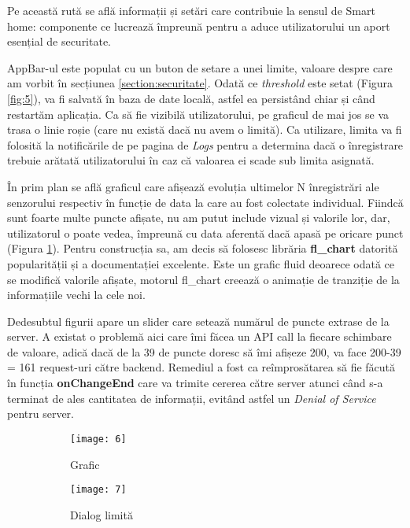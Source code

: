 Pe această rută se află informații și setări care contribuie la sensul de Smart home: componente ce lucrează împreună pentru a aduce utilizatorului un aport esențial de securitate.

AppBar-ul este populat cu un buton de setare a unei limite, valoare despre care am vorbit în secțiunea \ref{section:securitate}. Odată ce \emph{threshold} este setat (Figura \ref{fig:5}), va fi salvată în baza de date locală, astfel ea persistând chiar și când restartăm aplicația. Ca să fie vizibilă utilizatorului, pe graficul de mai jos se va trasa o linie roșie (care nu există dacă nu avem o limită). Ca utilizare, limita va fi folosită la notificările de pe pagina de \emph{Logs} pentru a determina dacă o înregistrare trebuie arătată utilizatorului în caz că valoarea ei scade sub limita asignată.

În prim plan se află graficul care afișează evoluția ultimelor N înregistrări ale senzorului respectiv în funcție de data la care au fost colectate individual. Fiindcă sunt foarte multe puncte afișate, nu am putut include vizual și valorile lor, dar, utilizatorul o poate vedea, împreună cu data aferentă dacă apasă pe oricare punct (Figura \ref{fig:6}). Pentru construcția sa, am decis să folosesc librăria \textbf{fl\_chart} datorită popularității și a documentației excelente. Este un grafic fluid deoarece odată ce se modifică valorile afișate, motorul fl\_chart creează o animație de tranziție de la informațiile vechi la cele noi.

Dedesubtul figurii apare un slider care setează numărul de puncte extrase de la server. A existat o problemă aici care îmi făcea un API call la fiecare schimbare de valoare, adică dacă de la 39 de puncte doresc să îmi afișeze 200, va face 200-39 = 161 request-uri către backend. Remediul a fost ca reîmprosătarea să fie făcută în funcția \textbf{onChangeEnd} care va trimite cererea către server atunci când s-a terminat de ales cantitatea de informații, evitând astfel un \emph{Denial of Service} pentru server.

\begin{figure}[h]
	\centering
	\begin{subfigure}{0.45\textwidth}
		\texttt{[image: 6]}
		\caption{Grafic}
		\label{fig:6}
	\end{subfigure}
	\hfill
	\begin{subfigure}{0.45\textwidth}
		\texttt{[image: 7]}
		\caption{Dialog limită}
		\label{fig:7}
	\end{subfigure}
	\caption{}
	\label{fig:all3}
\end{figure}

